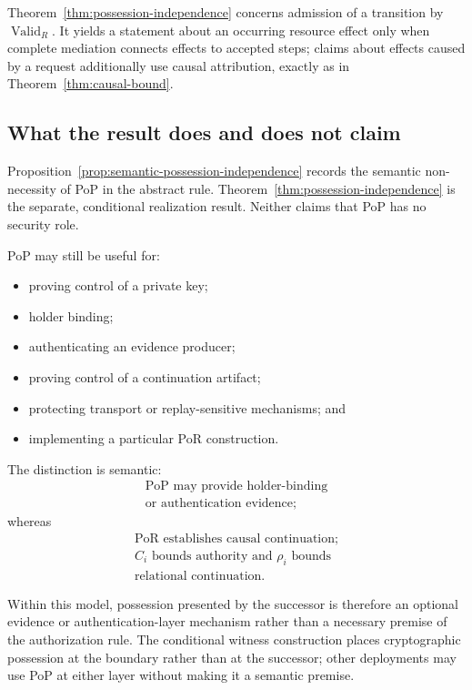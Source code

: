 \documentclass[10pt,twocolumn]{article}
\newcommand{\ValidR}{\operatorname{Valid}_{R}}
\begin{document}
Theorem~\ref{thm:possession-independence} concerns admission of a transition by
\(\ValidR\). It yields a statement about an occurring resource effect only when
complete mediation connects effects to accepted steps; claims about effects
caused by a request additionally use causal attribution, exactly as in
Theorem~\ref{thm:causal-bound}.

\subsection{What the result does and does not claim}

Proposition~\ref{prop:semantic-possession-independence} records the semantic
non-necessity of PoP in the abstract rule. Theorem~\ref{thm:possession-independence}
is the separate, conditional realization result. Neither claims that PoP has no
security role.

PoP may still be useful for:
\begin{itemize}
    \item proving control of a private key;
    \item holder binding;
    \item authenticating an evidence producer;
    \item proving control of a continuation artifact;
    \item protecting transport or replay-sensitive mechanisms; and
    \item implementing a particular PoR construction.
\end{itemize}

The distinction is semantic:
\[
\boxed{
\begin{gathered}
\text{PoP may provide holder-binding}\\
\text{or authentication evidence;}
\end{gathered}
}
\]
whereas
\[
\boxed{
\begin{array}{c}
\text{PoR establishes causal continuation;}\\
\text{\(C_i\) bounds authority and \(\rho_i\) bounds}\\
\text{relational continuation.}
\end{array}
}
\]

Within this model, possession presented by the successor is therefore an
optional evidence or authentication-layer mechanism rather than a necessary
premise of the authorization rule. The conditional witness construction places
cryptographic possession at the boundary rather than at the successor; other
deployments may use PoP at either layer without making it a semantic premise.
\end{document}
